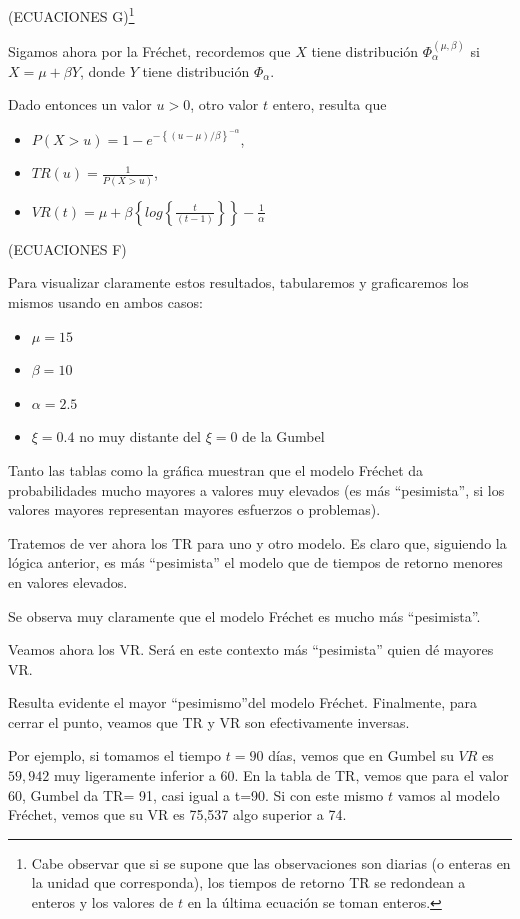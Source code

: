 \documentclass[
  oneside]{article}
\begin{document}
(ECUACIONES
G)\footnote{Cabe observar que si se supone que las observaciones son diarias (o enteras en la unidad que corresponda), los tiempos de retorno TR se redondean a enteros y los valores de $t$ en la última ecuación se toman enteros.}

Sigamos ahora por la Fréchet, recordemos que \(X\) tiene distribución
\(\Phi_{\alpha}^{( \mu,\beta)}\) si \(X= \mu+\beta Y\), donde \(Y\)
tiene distribución \(\Phi_{\alpha}\).

Dado entonces un valor \(u>0\), otro valor \(t\) entero, resulta que

\begin{itemize}
\item $P(X>u)=1-e^{ -\left \{( u- \mu)/\beta\right \}^{-\alpha}}$,
\item $TR(u)=\frac{1}{P(X>u)}$,
\item $VR(t)= \mu+ \beta\left \{log\left \{ \frac{t}{(t-1)}\right \}\right \}-\frac{1}{\alpha}$
\end{itemize}

(ECUACIONES F)

Para visualizar claramente estos resultados, tabularemos y graficaremos
los mismos usando en ambos casos:

\begin{itemize}
\item $\mu=15$
\item $\beta=10$
\item $\alpha=2.5$
\item $\xi=0.4$ no muy distante del $\xi=0$ de la Gumbel
\end{itemize}

Tanto las tablas como la gráfica muestran que el modelo Fréchet da
probabilidades mucho mayores a valores muy elevados (es más
``pesimista'', si los valores mayores representan mayores esfuerzos o
problemas).

Tratemos de ver ahora los TR para uno y otro modelo. Es claro que,
siguiendo la lógica anterior, es más ``pesimista'' el modelo que de
tiempos de retorno menores en valores elevados.

Se observa muy claramente que el modelo Fréchet es mucho más
``pesimista''.

Veamos ahora los VR. Será en este contexto más ``pesimista'' quien dé
mayores VR.

Resulta evidente el mayor ``pesimismo''del modelo Fréchet. Finalmente,
para cerrar el punto, veamos que TR y VR son efectivamente inversas.

Por ejemplo, si tomamos el tiempo \(t=90\) días, vemos que en Gumbel su
\(VR\) es \(59,942\) muy ligeramente inferior a 60. En la tabla de TR,
vemos que para el valor 60, Gumbel da TR= 91, casi igual a t=90. Si con
este mismo \(t\) vamos al modelo Fréchet, vemos que su VR es 75,537 algo
superior a 74.
\end{document}
